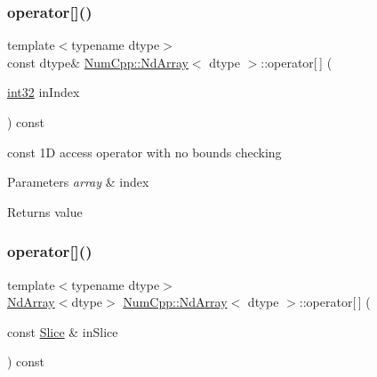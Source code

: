 \subsubsection{\texorpdfstring{operator[]()}{operator[]()}\hspace{0.1cm}{\footnotesize\ttfamily [2/3]}}
{\footnotesize\ttfamily template$<$typename dtype$>$ \\
const dtype\& \mbox{\hyperlink{class_num_cpp_1_1_nd_array}{Num\+Cpp\+::\+Nd\+Array}}$<$ dtype $>$\+::operator\mbox{[}$\,$\mbox{]} (\begin{DoxyParamCaption}\item[{\mbox{\hyperlink{namespace_num_cpp_acf3eb1592f8b248ff0a236634864633c}{int32}}}]{in\+Index }\end{DoxyParamCaption}) const\hspace{0.3cm}{\ttfamily [inline]}}

const 1D access operator with no bounds checking


\begin{DoxyParams}{Parameters}
{\em array} & index \\
\hline
\end{DoxyParams}
\begin{DoxyReturn}{Returns}
value 
\end{DoxyReturn}
\mbox{\label{class_num_cpp_1_1_nd_array_a7ce2e487c5f9b853d6de0265f303a143}} 
\subsubsection{\texorpdfstring{operator[]()}{operator[]()}\hspace{0.1cm}{\footnotesize\ttfamily [3/3]}}
{\footnotesize\ttfamily template$<$typename dtype$>$ \\
\mbox{\hyperlink{class_num_cpp_1_1_nd_array}{Nd\+Array}}$<$dtype$>$ \mbox{\hyperlink{class_num_cpp_1_1_nd_array}{Num\+Cpp\+::\+Nd\+Array}}$<$ dtype $>$\+::operator\mbox{[}$\,$\mbox{]} (\begin{DoxyParamCaption}\item[{const \mbox{\hyperlink{class_num_cpp_1_1_slice}{Slice}} \&}]{in\+Slice }\end{DoxyParamCaption}) const\hspace{0.3cm}{\ttfamily [inline]}}

